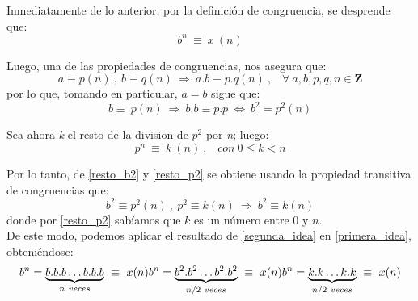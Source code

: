 	Inmediatamente de lo anterior, por la definición de congruencia, se desprende que:
	\begin{equation}
		b^n\ \equiv\ x\ (n)
	\label{primera_idea}
	\end{equation}

	Luego, una de las propiedades de congruencias, nos asegura que:
	\begin{equation}
		a \equiv p (n)\ ,\ b \equiv q (n)\ \Longrightarrow\ a.b \equiv p.q (n)\ , \hspace{10pt} \forall\ a,b,p,q,n \in \mathbf Z
	\end{equation}
por lo que, tomando en particular, $a=b$ sigue que:
	\begin{equation}
		b \equiv\ p (n)\ \Longrightarrow\ b.b \equiv p.p\  \Leftrightarrow\ b^2 = p^2 (n)
	\label{resto_b2}
	\end{equation}

	Sea ahora \textit{k} el resto de la division de $ p^2 $ por \textit{n}; luego:
	\begin{equation}
		p^n\ \equiv\ k\ (n)\ , \hspace{10pt} con\ 0 \leq k < n
	\label{resto_p2}
	\end{equation}

	Por lo tanto, de \ref{resto_b2} y \ref{resto_p2} se obtiene usando la propiedad transitiva de congruencias que:
	\begin{equation}
		b^2 \equiv p^2 (n)\ ,\ p^2 \equiv k (n)\ \Longrightarrow\ b^2 \equiv k (n)
	\label{segunda_idea}
	\end{equation}
donde por \ref{resto_p2} sabíamos que $k$ es un número entre 0 y $n$.\\

	De este modo, podemos aplicar el resultado de \ref{segunda_idea} en \ref{primera_idea}, obteniéndose:
	\begin{equation}
		b^n = \underbrace{b.b.b \hdots b.b.b}_{n\ veces}\ \equiv\ x (n) \\
		b^n = \underbrace{b^2. b^2 \hdots b^2. b^2}_{n/2\ veces}\ \equiv\ x (n) \\
		b^n = \underbrace{k. k \hdots k. k}_{n/2\ veces}\ \equiv\ x (n)
	\label{idea_final}
	\end{equation}
	

